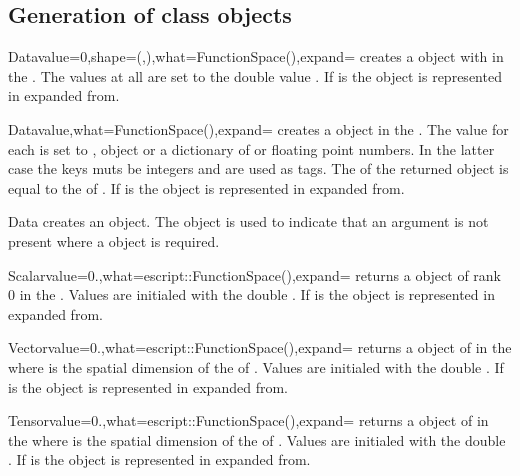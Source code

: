 \subsection{Generation of \Data class objects}
\begin{classdesc}{Data}{value=0,shape=(,),what=FunctionSpace(),expand=\False}
creates a \Data object with \Shape {} in the \FunctionSpace {}.
The values at all \DataSamplePoints are set to the double value . If  is \True
the \Data object is represented in expanded from.
\end{classdesc}

\begin{classdesc}{Data}{value,what=FunctionSpace(),expand=\False}
creates a \Data object in the \FunctionSpace {}. 
The value for each \DataSamplePoints is set to \numarray, \Data object  or a dictionary of 
\numarray or floating point numbers. In the latter case the keys muts be integers and are used
as tags.
The \Shape of the returned object is equal to the \Shape of . If  is \True
the \Data object is represented in expanded from.
\end{classdesc}

\begin{classdesc}{Data}{}
creates an \EmptyData object. The \EmptyData object is used to indicate that an argument is not present
where a \Data object is required.
\end{classdesc}

\begin{funcdesc}{Scalar}{value=0.,what=escript::FunctionSpace(),expand=\False}
returns a \Data object of rank 0 in the \FunctionSpace {}.
Values are initialed with the double . If  is \True
the \Data object is represented in expanded from.
\end{funcdesc}

\begin{funcdesc}{Vector}{value=0.,what=escript::FunctionSpace(),expand=\False}
returns a \Data object of \Shape {} in the \FunctionSpace {} 
where  is the spatial dimension of the \Domain of .
Values are initialed with the double . If  is \True
the \Data object is represented in expanded from.
\end{funcdesc}

\begin{funcdesc}{Tensor}{value=0.,what=escript::FunctionSpace(),expand=\False}
returns a \Data object of \Shape {} in the \FunctionSpace {} 
where  is the spatial dimension of the \Domain of .
Values are initialed with the double . If  is \True
the \Data object is represented in expanded from.
\end{funcdesc}

